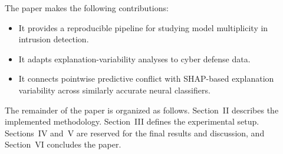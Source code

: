 The paper makes the following contributions:
\begin{itemize}
    \item It provides a reproducible pipeline for studying model multiplicity in intrusion detection.
    \item It adapts explanation-variability analyses to cyber defense data.
    \item It connects pointwise predictive conflict with \gls{SHAP}-based explanation variability across similarly accurate neural classifiers.
\end{itemize}

The remainder of the paper is organized as follows. Section~II describes the implemented methodology. Section~III defines the experimental setup. Sections~IV and~V are reserved for the final results and discussion, and Section~VI concludes the paper.
